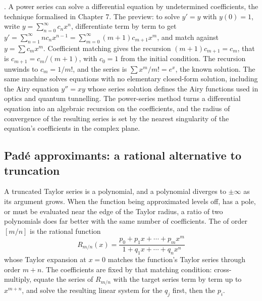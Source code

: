 \begin{mastery}
. A power series can solve a
differential equation by undetermined coefficients, the technique
formalised in Chapter 7. The preview: to solve $y' = y$ with $y(0) =
1$, write $y = \sum_{n=0}^{\infty} c_{n} x^{n}$, differentiate term by
term to get $y' = \sum_{n=1}^{\infty} n c_{n} x^{n-1} =
\sum_{m=0}^{\infty} (m+1) c_{m+1} x^{m}$, and match against $y =
\sum c_{m} x^{m}$. Coefficient matching gives the recursion $(m+1)
c_{m+1} = c_{m}$, that is $c_{m+1} = c_{m}/(m+1)$, with $c_{0} = 1$ from
the initial condition. The recursion unwinds to $c_{m} = 1/m!$, and the
series is $\sum x^{m}/m! = e^{x}$, the known solution. The same machine
solves equations with no elementary closed-form solution, including the
Airy equation $y'' = x y$ whose series solution defines the Airy
functions used in optics and quantum tunnelling. The power-series method
turns a differential equation into an algebraic recursion on the
coefficients, and the radius of convergence of the resulting series is
set by the nearest singularity of the equation's coefficients in the
complex plane.
\end{mastery}

\subsection{Pad\'{e} approximants: a rational alternative to truncation}

A truncated Taylor series is a polynomial, and a polynomial diverges to
$\pm\infty$ as its argument grows. When the function being approximated
levels off, has a pole, or must be evaluated near the edge of the
Taylor radius, a ratio of two polynomials does far better with the same
number of coefficients. The  of order
$[m/n]$ is the rational function
\[
R_{m/n}(x) = \frac{p_{0} + p_{1} x + \cdots + p_{m} x^{m}}{1 + q_{1} x
+ \cdots + q_{n} x^{n}}
\]
whose Taylor expansion at $x = 0$ matches the function's Taylor series
through order $m + n$. The coefficients are fixed by that matching
condition: cross-multiply, equate the series of $R_{m/n}$ with the
target series term by term up to $x^{m+n}$, and solve the resulting
linear system for the $q_{j}$ first, then the $p_{i}$.

